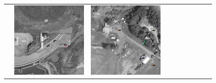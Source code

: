 \begin{figure}[h!]
\begin{tabularx}{\textwidth}{c|*{9}{X}}
    & \includegraphics[trim={440pt 360pt 460pt 555pt},clip,width=\linewidth]{images/015Results/03ablation/comp_images/green/427.png}
    & \includegraphics[trim={740pt 420pt 180pt 510pt},clip,width=\linewidth]{images/015Results/03ablation/comp_images/green/523.png}

\end{tabularx}
\end{figure}
